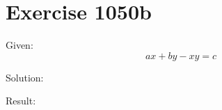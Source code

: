 \documentclass[a4paper, 10pt]{scrartcl}
\begin{document}
\section{Exercise 1050b}

Given:
\[
ax + by - xy = c
\]

Solution:

Result:
\end{document}

